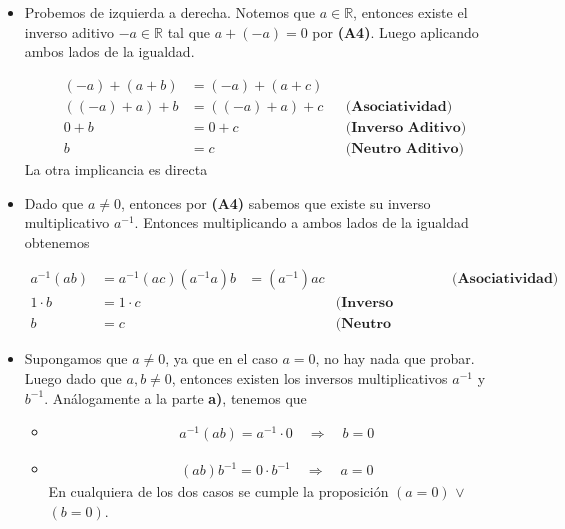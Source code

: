 \documentclass[12pt]{book}
\begin{document}
\begin{itemize}
    \item[\textbf{a)}] Probemos de izquierda a derecha. Notemos que $a \in \mathbb{R}$, entonces existe el inverso aditivo $-a \in \mathbb{R}$ tal que $a+(-a)=0$ por \textbf{(A4)}. Luego aplicando ambos lados de la igualdad.

    \begin{align*}
        (-a)+(a+b)&=(-a)+(a+c) \\
        ((-a)+a)+b&=((-a)+a)+c && \textbf{(Asociatividad)} \\
        0+b&=0+c && \textbf{(Inverso Aditivo)} \\
        b&=c && \textbf{(Neutro Aditivo)}
    \end{align*}
La otra implicancia es directa
    
    \item[\textbf{b)}] Dado que $a \neq 0$, entonces por \textbf{(A4)} sabemos que existe su inverso multiplicativo $a^{-1}$. Entonces multiplicando a ambos lados de la igualdad obtenemos

    \begin{align*}
        a^{-1}(ab)&=a^{-1}(ac) 
        (a^{-1}a)b&=(a^{-1})ac &&  \textbf{(Asociatividad)} \\
        1\cdot b &= 1 \cdot c && \textbf{(Inverso Multiplicativo)} \\
        b&=c && \textbf{(Neutro Multiplicativo)}
    \end{align*}
    
    \item[\textbf{c)}]  Supongamos que $a \neq 0$, ya que en el caso $a=0$, no hay nada que probar. Luego dado que $a,b \neq 0$, entonces existen los inversos multiplicativos $a^{-1}$ y $b^{-1}$. Análogamente a la parte \textbf{a)}, tenemos que

    \begin{itemize}
        \item[\textbf{Caso 1:}]   
        \begin{align*}
            a^{-1}(ab)=  a^{-1} \cdot 0 \quad \Longrightarrow \quad b=0
        \end{align*}

          \item[\textbf{Caso 2:}]

            \begin{align*}
            (ab)b^{-1}=0 \cdot b^{-1} \quad \Longrightarrow \quad a=0
          \end{align*}
    En cualquiera de los dos casos se cumple la proposición  $(a=0)$ $\vee$ $(b=0)$.
    \end{itemize}    
\end{itemize}
\end{document}
